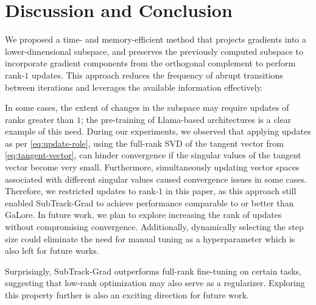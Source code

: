 \section{Discussion and Conclusion}
We proposed a time- and memory-efficient method that projects gradients into a lower-dimensional subspace, and preserves the previously computed subspace to incorporate gradient components from the orthogonal complement to perform rank-\(1\) updates. This approach reduces the frequency of abrupt transitions between iterations and leverages the available information effectively.

In some cases, the extent of changes in the subspace may require updates of ranks greater than \(1\); the pre-training of Llama-based architectures is a clear example of this need. During our experiments, we observed that applying updates as per \eqref{eq:update-role}, using the full-rank SVD of the tangent vector from \eqref{eq:tangent-vector}, can hinder convergence if the singular values of the tangent vector become very small. Furthermore, simultaneously updating vector spaces associated with different singular values caused convergence issues in some cases. Therefore, we restricted updates to rank-\(1\) in this paper, as this approach still enabled SubTrack-Grad to achieve performance comparable to or better than GaLore. In future work, we plan to explore increasing the rank of updates without compromising convergence. Additionally, dynamically selecting the step size could eliminate the need for manual tuning as a hyperparameter which is also left for future works. 

Surprisingly, SubTrack-Grad outperforms full-rank fine-tuning on certain tasks, suggesting that low-rank optimization may also serve as a regularizer. Exploring this property further is also an exciting direction for future work.